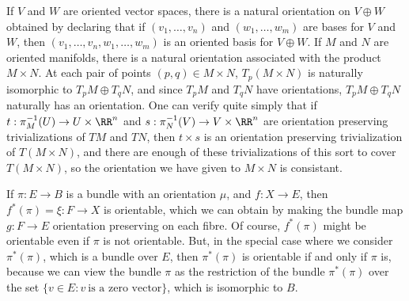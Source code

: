 \begin{example}
    If $V$ and $W$ are oriented vector spaces, there is a natural orientation on $V \oplus W$ obtained by declaring that if $(v_1, \dots, v_n)$ and $(w_1, \dots, w_m)$ are bases for $V$ and $W$, then $(v_1, \dots, v_n, w_1, \dots, w_m)$ is an oriented basis for $V \oplus W$. If $M$ and $N$ are oriented manifolds, there is a natural orientation associated with the product $M \times N$. At each pair of points $(p,q) \in M \times N$, $T_p(M \times N)$ is naturally isomorphic to $T_p M \oplus T_q N$, and since $T_p M$ and $T_q N$ have orientations, $T_p M \oplus T_q N$ naturally has an orientation. One can verify quite simply that if $t: \pi_M^{-1}(U) \to U \times \RR^n$ and $s: \pi_N^{-1}(V) \to V \times \RR^n$ are orientation preserving trivializations of $TM$ and $TN$, then $t \times s$ is an orientation preserving trivialization of $T(M \times N)$, and there are enough of these trivializations of this sort to cover $T(M \times N)$, so the orientation we have given to $M \times N$ is consistant.
\end{example}

\begin{example}
    If $\pi: E \to B$ is a bundle with an orientation $\mu$, and $f: X \to E$, then $f^*(\pi) = \xi: F \to X$ is orientable, which we can obtain by making the bundle map $g: F \to E$ orientation preserving on each fibre. Of course, $f^*(\pi)$ might be orientable even if $\pi$ is not orientable. But, in the special case where we consider $\pi^*(\pi)$, which is a bundle over $E$, then $\pi^*(\pi)$ is orientable if and only if $\pi$ is, because we can view the bundle $\pi$ as the restriction of the bundle $\pi^*(\pi)$ over the set $\{ v \in E: v\ \text{is a zero vector} \}$, which is isomorphic to $B$.
\end{example}

